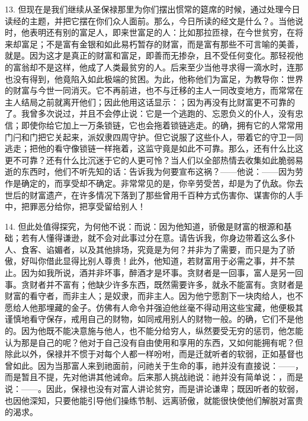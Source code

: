 13. 但现在是我们继续从圣保禄那里为你们摆出惯常的筵席的时候，通过处理今日读经的主题，并把它摆在你们众人面前。那么，今日所读的经文是什么？。当他说时，他表明还有别的富足人，即来世富足的人：比如那拉匝禄，在今世贫穷，在将来却富足；不是富有金银和如此易朽暂存的财富，而是富有那些不可言喻的美善，就是。因为这才是真正的财富和富足，即善而无掺杂，且不受任何变化。那轻视他的富翁却不是这样，他成了人类最贫穷的人。后来至少当他寻求得一滴水时，连那也没有得到，他竟陷入如此极端的贫困。为此，他称他们为富足，为教导你：世界的财富与今世一同消灭。它不再前进，也不与迁移的主人一同改变地方，而常常在主人结局之前就离开他们；因此他用这话显示：；因为再没有比财富更不可靠的了。我曾多次说过，并且不会停止说：它是一个逃跑的、忘恩负义的仆人，没有忠信；即使你给它加上一万条锁链，它也会拖着锁链逃走。的确，拥有它的人常常用门闩和门把它关起来，派奴隶四周守护。但它说服了这些仆人，带着它的守卫一同逃走；把他的看守像锁链一样拖着，这监守竟是如此不可靠。那么，还有什么比这更不可靠？还有什么比沉迷于它的人更可怜？当人们以全部热情去收集如此脆弱易逝的东西时，他们不听先知的话：告诉我为何要宣布这祸？——他说：——因为劳作是确定的，而享受却不确定。非常常见的是，你辛劳受苦，却是为了仇敌。你去世后的财富遗产，在许多情况下落到了那些曾用千百种方式伤害你、谋害你的人手中，把罪恶分给你，把享受留给别人！\par

14. 但此处值得探究，为何他不说：而说：因为他知道，骄傲是财富的根源和基础；若有人懂得谦逊，就不会对此事过分在意。请告诉我，你身边带着这么多仆人、食客、谄媚者，以及其他排场，究竟是为何？并非为了需要，而只是为了骄傲，好叫你借此显得比别人尊贵！此外，他知道，若财富用于必需之事，并不禁止。因为如我所说，酒并非坏事，醉酒才是坏事。贪财者是一回事，富人是另一回事。贪财者并不富有；他缺少许多东西，既然需要许多，就永不能富有。贪财者是财富的看守者，而非主人；是奴隶，而非主人。因为他宁愿割下一块肉给人，也不愿给人他那埋藏的金子。仿佛有人命令并强迫他丝毫不得动用这些宝藏，他便极其谨慎地看守保存，戒用自己的财物，如同戒用别人的财物一般。的确，它们不是他的。因为他既不能决意施与他人，也不能分给穷人，纵然要受无穷的惩罚，他怎能认为那是自己的呢？他对于自己没有自由使用和享用的东西，又如何能拥有呢？但除此以外，保禄并不惯于对每个人都一样吩咐，而是迁就听者的软弱，正如基督也曾如此。因为当那富人来到祂面前，问祂关于生命的事，祂并没有直接说：——，而是暂且不提，先对他讲其他诫命。后来那人挑战祂说：祂并没有简单说：，而是说：——。因此，保禄也没有对富人讲论贫穷，而是讲论谦卑；既因听者的软弱，也因他深知，只要他能引导他们操练节制、远离骄傲，就能很快使他们解脱对富贵的渴求。\par

